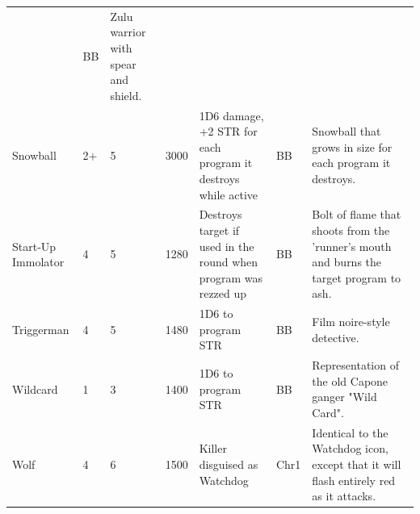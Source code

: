 \documentclass[11pt,twoside,a4paper]{article}
\begin{document}
\begin{landscape}
\begin{longtable}[ht]{ p{3.00cm} p{0.75cm} p{0.75cm} p{1.25cm} p{10.00cm} p{0.75cm} p{7.50cm} }
		&	BB	&		Zulu warrior with spear and shield.	\\
	Snowball			&	2+	&	5	&	3000	&	1D6 damage, +2 STR for each program it destroys while active	
		&	BB	&		Snowball that grows in size for each program it destroys.	\\
	Start-Up Immolator			&	4	&	5	&	1280	&	Destroys target if used in the round when program was rezzed up	
		&	BB	&		Bolt of flame that shoots from the 'runner's mouth and burns the target program to ash.	\\
	Triggerman			&	4	&	5	&	1480	&	1D6 to program STR	
		&	BB	&		Film noire-style detective.	\\
	Wildcard			&	1	&	3	&	1400	&	1D6 to program STR	
		&	BB	&		Representation of the old Capone ganger "Wild Card".	\\
	Wolf				&	4	&	6	&	1500	&	Killer disguised as Watchdog	
		&	Chr1	&		Identical to the Watchdog icon, except that it will flash entirely red as it attacks.	\\



\end{longtable}
\end{landscape}
\end{document}
